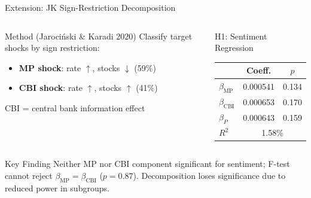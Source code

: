 \documentclass[aspectratio=169, 11pt]{beamer}
\begin{document}
\begin{frame}{Extension: JK Sign-Restriction Decomposition}
\begin{columns}[T]
\begin{ablock}{Method (Jarociński \& Karadi 2020)}
Classify target shocks by sign restriction:
\begin{itemize}
  \item \textbf{MP shock}: rate $\uparrow$, stocks $\downarrow$ (59\%)
  \item \textbf{CBI shock}: rate $\uparrow$, stocks $\uparrow$ (41\%)
\end{itemize}
\vspace{0.2em}
{\small CBI = central bank information effect}
\end{ablock}

\begin{ablock}{H1: Sentiment Regression}
{\small
\begin{tabular}{lcc}
\toprule
 & Coeff. & $p$ \\
\midrule
$\beta_\text{MP}$ & 0.000541 & 0.134 \\
$\beta_\text{CBI}$ & 0.000653 & 0.170 \\
$\beta_P$ & 0.000643 & 0.159 \\
\midrule
$R^2$ & \multicolumn{2}{c}{1.58\%} \\
\bottomrule
\end{tabular}
}
\end{ablock}
\end{columns}

\vspace{0.3em}
\begin{aalertblock}{Key Finding}
Neither MP nor CBI component significant for sentiment; F-test cannot reject $\beta_\text{MP} = \beta_\text{CBI}$ ($p = 0.87$). Decomposition loses significance due to reduced power in subgroups.
\end{aalertblock}
\end{frame}
\end{document}
